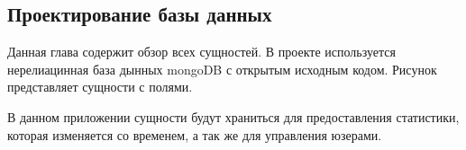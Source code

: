 \subsection{Проектирование базы данных}

Данная глава содержит обзор всех сущностей. В проекте используется нерелиацинная база дынных mongoDB с открытым исходным кодом. Рисунок представляет сущности с полями.

В данном приложении сущности будут храниться для предоставления статистики, которая изменяется со временем, а так же для управления юзерами.

